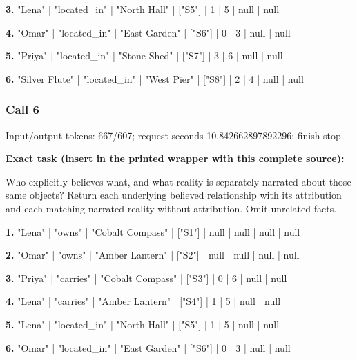 \noindent\textbf{3.} "Lena" | "located\_in" | "North Hall" | ["S5"] | 1 | 5 | null | null\par\smallskip

\noindent\textbf{4.} "Omar" | "located\_in" | "East Garden" | ["S6"] | 0 | 3 | null | null\par\smallskip

\noindent\textbf{5.} "Priya" | "located\_in" | "Stone Shed" | ["S7"] | 3 | 6 | null | null\par\smallskip

\noindent\textbf{6.} "Silver Flute" | "located\_in" | "West Pier" | ["S8"] | 2 | 4 | null | null\par\smallskip

\subsubsection*{Call 6}

Input/output tokens: 667/607; request seconds 10.842662897892296; finish stop.

\noindent\textbf{Exact task (insert in the printed wrapper with this complete source):}\par Who explicitly believes what, and what reality is separately narrated about those same objects? Return each underlying believed relationship with its attribution and each matching narrated reality without attribution. Omit unrelated facts.

\noindent\textbf{1.} "Lena" | "owns" | "Cobalt Compass" | ["S1"] | null | null | null | null\par\smallskip

\noindent\textbf{2.} "Omar" | "owns" | "Amber Lantern" | ["S2"] | null | null | null | null\par\smallskip

\noindent\textbf{3.} "Priya" | "carries" | "Cobalt Compass" | ["S3"] | 0 | 6 | null | null\par\smallskip

\noindent\textbf{4.} "Lena" | "carries" | "Amber Lantern" | ["S4"] | 1 | 5 | null | null\par\smallskip

\noindent\textbf{5.} "Lena" | "located\_in" | "North Hall" | ["S5"] | 1 | 5 | null | null\par\smallskip

\noindent\textbf{6.} "Omar" | "located\_in" | "East Garden" | ["S6"] | 0 | 3 | null | null\par\smallskip

